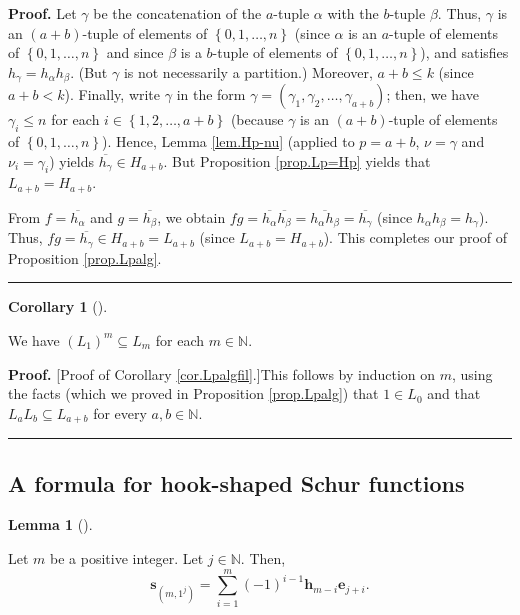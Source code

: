 \documentclass[numbers=enddot,12pt,final,onecolumn,notitlepage]{scrartcl}%
\theoremstyle{definition}
\newtheorem{lem}[theo]{Lemma}
\newenvironment{lemma}[1][]
{\begin{lem}[#1]\begin{leftbar}}
{\end{leftbar}\end{lem}}
\newtheorem{coro}[theo]{Corollary}
\newenvironment{corollary}[1][]
{\begin{coro}[#1]\begin{leftbar}}
{\end{leftbar}\end{coro}}
\newenvironment{proof}[1][Proof]{\noindent\textbf{#1.} }{\ \rule{0.5em}{0.5em}}
\let\sumnonlimits\sum
\renewcommand{\sum}{\sumnonlimits\limits}
\begin{document}
\begin{proof}
Let $\gamma$ be the concatenation of the $a$-tuple $\alpha$ with the $b$-tuple
$\beta$. Thus, $\gamma$ is an $\left(  a+b\right)  $-tuple of elements of
$\left\{  0,1,\ldots,n\right\}  $ (since $\alpha$ is an $a$-tuple of elements
of $\left\{  0,1,\ldots,n\right\}  $ and since $\beta$ is a $b$-tuple of
elements of $\left\{  0,1,\ldots,n\right\}  $), and satisfies $h_{\gamma
}=h_{\alpha}h_{\beta}$. (But $\gamma$ is not necessarily a partition.)
Moreover, $a+b\leq k$ (since $a+b<k$). Finally, write $\gamma$ in the form
$\gamma=\left(  \gamma_{1},\gamma_{2},\ldots,\gamma_{a+b}\right)  $; then, we
have $\gamma_{i}\leq n$ for each $i\in\left\{  1,2,\ldots,a+b\right\}  $
(because $\gamma$ is an $\left(  a+b\right)  $-tuple of elements of $\left\{
0,1,\ldots,n\right\}  $). Hence, Lemma \ref{lem.Hp-nu} (applied to $p=a+b$,
$\nu=\gamma$ and $\nu_{i}=\gamma_{i}$) yields $\overline{h_{\gamma}}\in
H_{a+b}$. But Proposition \ref{prop.Lp=Hp} yields that $L_{a+b}=H_{a+b}$.

From $f=\overline{h_{\alpha}}$ and $g=\overline{h_{\beta}}$, we obtain
$fg=\overline{h_{\alpha}}\overline{h_{\beta}}=\overline{h_{\alpha}h_{\beta}%
}=\overline{h_{\gamma}}$ (since $h_{\alpha}h_{\beta}=h_{\gamma}$). Thus,
$fg=\overline{h_{\gamma}}\in H_{a+b}=L_{a+b}$ (since $L_{a+b}=H_{a+b}$). This
completes our proof of Proposition \ref{prop.Lpalg}.
\end{proof}

\begin{corollary}
\label{cor.Lpalgfil}We have $\left(  L_{1}\right)  ^{m}\subseteq L_{m}$ for
each $m\in\mathbb{N}$.
\end{corollary}

\begin{proof}
[Proof of Corollary \ref{cor.Lpalgfil}.]This follows by induction on $m$,
using the facts (which we proved in Proposition \ref{prop.Lpalg}) that $1\in
L_{0}$ and that $L_{a}L_{b}\subseteq L_{a+b}$ for every $a,b\in\mathbb{N}$.
\end{proof}

\subsection{A formula for hook-shaped Schur functions}

\begin{lemma}
\label{lem.sm1j.1}Let $m$ be a positive integer. Let $j\in\mathbb{N}$. Then,%
\[
\mathbf{s}_{\left(  m,1^{j}\right)  }=\sum_{i=1}^{m}\left(  -1\right)
^{i-1}\mathbf{h}_{m-i}\mathbf{e}_{j+i}.
\]

\end{lemma}
\end{document}

